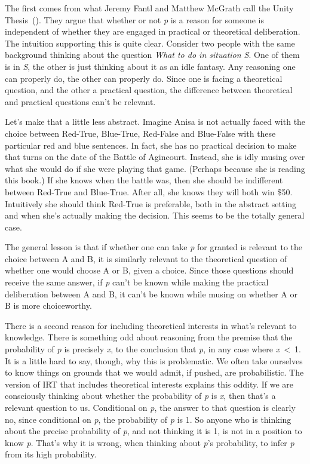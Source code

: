 \documentclass[
  10pt,
  letterpaper,
  twoside]{scrbook}
\begin{document}
The first comes from what Jeremy Fantl and Matthew McGrath call the
Unity Thesis~(). They argue that whether or not \emph{p} is a reason for
someone is independent of whether they are engaged in practical or
theoretical deliberation. The intuition supporting this is quite clear.
Consider two people with the same background thinking about the question
\emph{What to do in situation S}. One of them is in \emph{S}, the other
is just thinking about it as an idle fantasy. Any reasoning one can
properly do, the other can properly do. Since one is facing a
theoretical question, and the other a practical question, the difference
between theoretical and practical questions can't be relevant.

Let's make that a little less abstract. Imagine Anisa is not actually
faced with the choice between Red-True, Blue-True, Red-False and
Blue-False with these particular red and blue sentences. In fact, she
has no practical decision to make that turns on the date of the Battle
of Agincourt. Instead, she is idly musing over what she would do if she
were playing that game. (Perhaps because she is reading this book.) If
she knows when the battle was, then she should be indifferent between
Red-True and Blue-True. After all, she knows they will both win \$50.
Intuitively she should think Red-True is preferable, both in the
abstract setting and when she's actually making the decision. This seems
to be the totally general case.

The general lesson is that if whether one can take \emph{p} for granted
is relevant to the choice between A and B, it is similarly relevant to
the theoretical question of whether one would choose A or B, given a
choice. Since those questions should receive the same answer, if
\emph{p} can't be known while making the practical deliberation between
A and B, it can't be known while musing on whether A or B is more
choiceworthy.

There is a second reason for including theoretical interests in what's
relevant to knowledge. There is something odd about reasoning from the
premise that the probability of \emph{p} is precisely \emph{x}, to the
conclusion that \emph{p}, in any case where \emph{x}~\textless~1. It is
a little hard to say, though, why this is problematic. We often take
ourselves to know things on grounds that we would admit, if pushed, are
probabilistic. The version of IRT that includes theoretical interests
explains this oddity. If we are consciously thinking about whether the
probability of \emph{p} is \emph{x}, then that's a relevant question to
us. Conditional on \emph{p}, the answer to that question is clearly no,
since conditional on \emph{p}, the probability of \emph{p} is 1. So
anyone who is thinking about the precise probability of \emph{p}, and
not thinking it is 1, is not in a position to know \emph{p}. That's why
it is wrong, when thinking about \emph{p}'s probability, to infer
\emph{p} from its high probability.
\end{document}
